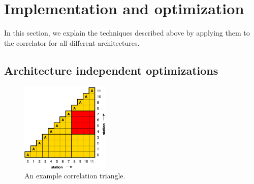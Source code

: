 \documentclass{article}
\begin{document}
\section{Implementation and optimization}
\label{sec:optimizing}

In this section,
we explain the techniques described above by applying them to the
correlator for all different architectures.


\subsection{Architecture independent optimizations}
\label{sec:tiling}

\begin{figure}[t]
\begin{center}
\includegraphics[width=4.2cm]{figures/correlation-triangle.pdf}
\end{center}
\vspace{-0.5cm}
\caption{An example correlation triangle.}
\label{fig-correlation}
\end{figure}
\end{document}
